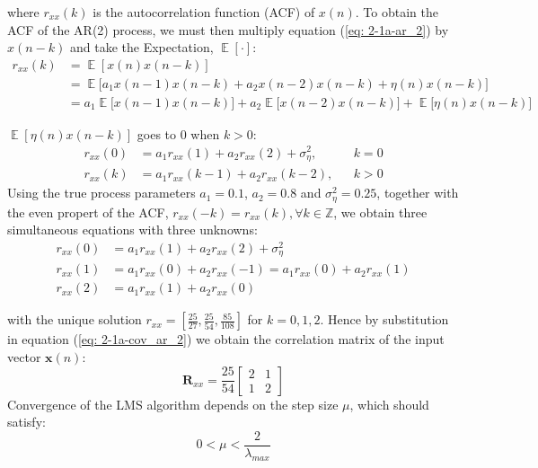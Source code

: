 \documentclass[12pt]{article}
\numberwithin{equation}{section}
\DeclareMathOperator*{\E}{\mathbb{E}}
\def\setInteger{{\mathbb{Z}}}
\begin{document}
			where $r_{xx}(k)$ is the autocorrelation function (ACF) of $x(n)$. To obtain the ACF of the AR(2) process, we must then multiply equation (\ref{eq: 2-1a-ar_2}) by $x(n-k)$ and take the Expectation, $\E[\cdot]$:
			\begin{align}
			r_{xx}(k) &= \E[ x(n) x(n-k) ] \nonumber\\
			  		  &= \E \bigg[ a_{1} x(n - 1) x(n-k) + a_{2} x(n - 2) x(n-k) + \eta(n) x(n-k) \bigg] \nonumber\\
			  		  &= a_{1} \E \big[ x(n - 1) x(n-k) \big] + a_{2} \E \big[ x(n - 2) x(n-k) \big] + \E \big[ \eta(n) x(n-k) \big]
			\end{align}
			
			$\E [\eta(n) x(n-k)]$ goes to $0$ when $k > 0$: 
			\vspace*{-0.2\baselineskip}
			\begin{align}
			r_{xx}(0)   &= a_{1} r_{xx}(1) + a_{2} r_{xx}(2) + \sigma_{\eta}^{2},  && k = 0 \\
			r_{xx}(k)   &= a_{1} r_{xx}(k-1) + a_{2} r_{xx}(k-2),   && k > 0
			\label{eq: 2-1a-acf_ar_2}
			\end{align}
			\noindent
			Using the true process parameters $a_{1} = 0.1$, $a_{2} = 0.8$ and $\sigma_{\eta}^{2} = 0.25$, together with the even propert of the ACF, $r_{xx}(-k) = r_{xx}(k), \forall k \in \setInteger$, we obtain three simultaneous equations with three unknowns:
			\vspace*{-\baselineskip}
			\begin{align}
			r_{xx}(0)   &= a_{1} r_{xx}(1) + a_{2} r_{xx}(2) + \sigma_{\eta}^{2} \\
			r_{xx}(1)   &= a_{1} r_{xx}(0) + a_{2} r_{xx}(-1) = a_{1} r_{xx}(0) + a_{2} r_{xx}(1) \\
			r_{xx}(2)   &= a_{1} r_{xx}(1) + a_{2} r_{xx}(0)
			\end{align}
			
			with the unique solution $r_{xx} = [\frac{25}{27}, \frac{25}{54}, \frac{85}{108}]$ for $k=0, 1, 2$. \newline
			\noindent
			Hence by substitution in equation (\ref{eq: 2-1a-cov_ar_2}) we obtain the  correlation matrix of the input vector $\mathbf{x}(n)$:
			\begin{equation}
			\mathbf{R}_{xx} = 
			\frac{25}{54}
			\begin{bmatrix}
			2 & 1 \\
			1 & 2
			\end{bmatrix}
			\label{eq: 2-1a-cov_ar_2_result}
			\end{equation}
			\noindent
			Convergence of the LMS algorithm depends on the step size $\mu$, which should satisfy:
			\begin{equation}
			0 < \mu < \frac{2}{\lambda_{max}}
			\label{eq: 2-1a-cond:mu_max}
			\end{equation}
			
\end{document}
